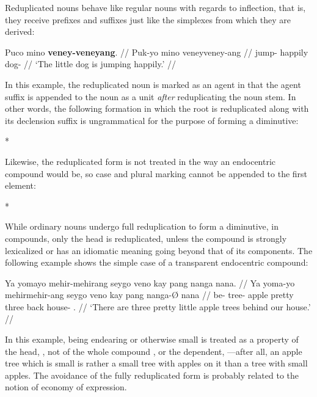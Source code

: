 Reduplicated nouns behave like regular nouns with regards to inflection, that 
is, they receive prefixes and suffixes just like the simplexes from which they 
are derived:

\ex\begingl
	\gla Puco mino \textbf{veney-veneyang}. //
	\glb Puk-yo mino veney\til{}veney-ang //
	\glc jump-\TsgN{} happily \Dim{}\til{}dog-\Aarg{} //
	\glft `The little dog is jumping happily.' //
\endgl\xe

In this example, the reduplicated noun  is 
marked as an agent in that the agent suffix  is appended to 
the noun as a unit \emph{after} reduplicating the noun stem. In other words, 
the following formation in which the root is reduplicated along with its 
declension suffix is ungrammatical for the purpose of forming a diminutive:

\ex
	*
\xe

Likewise, the reduplicated form is not treated in the way an endocentric 
compound would be, so case and plural marking cannot be appended to the first 
element:

\ex
	*
\xe

While ordinary nouns undergo full reduplication to form a diminutive, in 
compounds, only the head is reduplicated, unless the compound is strongly 
lexicalized or has an idiomatic meaning going beyond that of its components. 
The following example shows the simple case of a transparent endocentric 
compound:

\ex\begingl
	\gla Ya yomayo mehir-mehirang seygo veno kay pang nanga nana. //
	\glb Ya yoma-yo mehir\til{}mehir-ang seygo veno kay pang nanga-Ø nana //
	\glc \LocT{} be-\TsgN{} \Dim{}\til{}tree-\Aarg{} apple pretty three 
		back house-\Top{} \Fpl{}.\Gen{} //
	\glft `There are three pretty little apple trees behind our house.' //
\endgl\xe

In this example, being endearing or otherwise small is treated as a property of 
the head, , not of the whole compound 
, or the dependent, 
---after all, an apple tree which is small is 
rather a small tree with apples on it than a tree with small apples. The 
avoidance of the fully reduplicated form 
 is probably related to 
the notion of economy of expression.


